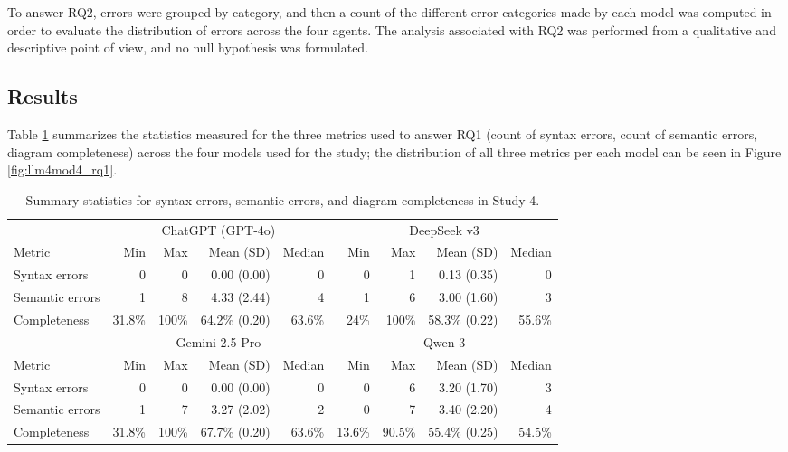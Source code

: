 To answer RQ2, errors were grouped by category, and then a count of the different error categories made by each model was computed in order to evaluate the distribution of errors across the four agents. The analysis associated with RQ2 was performed from a qualitative and descriptive point of view, and no null hypothesis was formulated.

\subsection{Results}

Table \ref{tab:rq1_llm4mod4} summarizes the statistics measured for the three metrics used to answer RQ1 (count of syntax errors, count of semantic errors, diagram completeness) across the four models used for the study; the distribution of all three metrics per each model can be seen in Figure \ref{fig:llm4mod4_rq1}.

\begin{table}[ht]
\centering
\caption{Summary statistics for syntax errors, semantic errors, and diagram completeness in Study 4.}
\label{tab:rq1_llm4mod4}
\small
\setlength{\tabcolsep}{4pt}
\begin{tabular}{lrrrrrrrr}
\toprule
& \multicolumn{4}{c}{ChatGPT (GPT-4o)} & \multicolumn{4}{c}{DeepSeek v3} \\
\cmidrule(lr){2-5}\cmidrule(lr){6-9}
Metric & Min & Max & Mean (SD) & Median & Min & Max & Mean (SD) & Median \\
\midrule
Syntax errors    & 0 & 0 & 0.00 (0.00) & 0 & 0 & 1 & 0.13 (0.35) & 0 \\
Semantic errors  & 1 & 8 & 4.33 (2.44) & 4 & 1 & 6 & 3.00 (1.60) & 3 \\
Completeness     & 31.8\% & 100\% & 64.2\% (0.20) & 63.6\% & 24\% & 100\% & 58.3\% (0.22) & 55.6\% \\
\midrule
& \multicolumn{4}{c}{Gemini 2.5 Pro} & \multicolumn{4}{c}{Qwen 3} \\
\cmidrule(lr){2-5}\cmidrule(lr){6-9}
Metric & Min & Max & Mean (SD) & Median & Min & Max & Mean (SD) & Median \\
\midrule
Syntax errors    & 0 & 0 & 0.00 (0.00) & 0 & 0 & 6 & 3.20 (1.70) & 3 \\
Semantic errors  & 1 & 7 & 3.27 (2.02) & 2 & 0 & 7 & 3.40 (2.20) & 4 \\
Completeness     & 31.8\% & 100\% & 67.7\% (0.20) & 63.6\% & 13.6\% & 90.5\% & 55.4\% (0.25) & 54.5\% \\
\bottomrule
\end{tabular}
\end{table}

